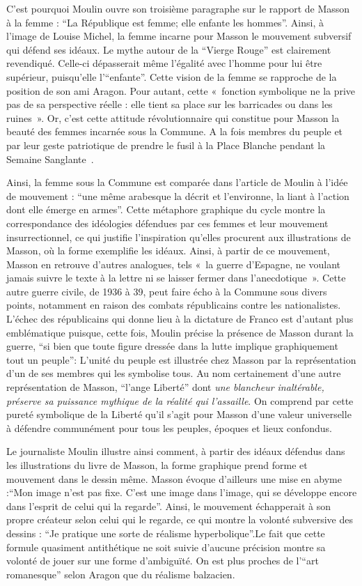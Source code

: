     C’est pourquoi Moulin ouvre son troisième paragraphe sur le rapport de Masson à la femme : \enquote{La République est femme; elle enfante les hommes}. Ainsi, à l’image de Louise Michel, la femme incarne pour Masson le mouvement subversif qui défend ses idéaux. Le mythe autour de la \enquote{Vierge Rouge} est clairement revendiqué. Celle-ci dépasserait même l’égalité avec l’homme pour lui être supérieur, puisqu’elle l’\enquote{enfante}. Cette vision de la femme se rapproche de  la position de son ami Aragon. Pour autant, cette « fonction symbolique ne la prive pas de sa perspective réelle : elle tient sa place sur les barricades ou dans les ruines ». Or, c’est cette attitude révolutionnaire qui constitue pour Masson la beauté des femmes incarnée sous la Commune. A la fois membres du peuple et par leur geste patriotique de prendre le fusil à la Place Blanche pendant la Semaine Sanglante .


    Ainsi, la femme sous la Commune est comparée dans l’article de Moulin à l’idée de mouvement : \enquote{une même arabesque la décrit et l’environne, la liant à l’action dont elle émerge en armes}. Cette métaphore graphique du cycle montre la correspondance des idéologies défendues par ces femmes et leur mouvement insurrectionnel, ce qui justifie l’inspiration qu’elles procurent aux illustrations de Masson, où la forme exemplifie les idéaux. Ainsi, à partir de ce mouvement, Masson en retrouve d’autres analogues, tels « la guerre d’Espagne, ne voulant jamais suivre le texte à la lettre ni se laisser fermer dans l’anecdotique ». Cette autre guerre civile, de 1936 à 39, peut faire écho à la Commune sous divers points, notamment en raison des combats républicains contre les nationalistes. L’échec des républicains qui donne lieu à la dictature de Franco est d’autant plus emblématique puisque, cette fois, Moulin précise la présence de Masson durant la guerre, \enquote{si bien que toute figure dressée dans la lutte implique graphiquement tout un peuple}: L’unité du peuple est illustrée chez Masson par la représentation d’un de ses membres qui les symbolise tous. Au nom certainement d’une autre représentation de Masson, \enquote{l’ange Liberté} dont \emph{une blancheur inaltérable, préserve sa puissance mythique de la réalité qui l’assaille}. On comprend par cette pureté symbolique de la Liberté qu’il s’agit pour Masson d’une valeur universelle à défendre communément pour tous les peuples, époques et lieux confondus. 


Le journaliste Moulin illustre ainsi comment, à partir des idéaux défendus dans les illustrations du livre de Masson, la forme graphique prend forme et mouvement dans le dessin même. Masson évoque d’ailleurs une mise en abyme :\enquote{Mon image n’est pas fixe. C’est une image dans l’image, qui se développe encore dans l’esprit de celui qui la regarde}. Ainsi, le mouvement échapperait à son propre créateur selon celui qui le regarde, ce qui montre la volonté subversive des dessins : \enquote{Je pratique une sorte de réalisme hyperbolique}.Le fait que cette formule quasiment antithétique ne soit suivie d’aucune précision montre sa volonté de jouer sur une forme d’ambiguïté. On est plus proches de l’\enquote{art romanesque} selon Aragon que du réalisme balzacien.

